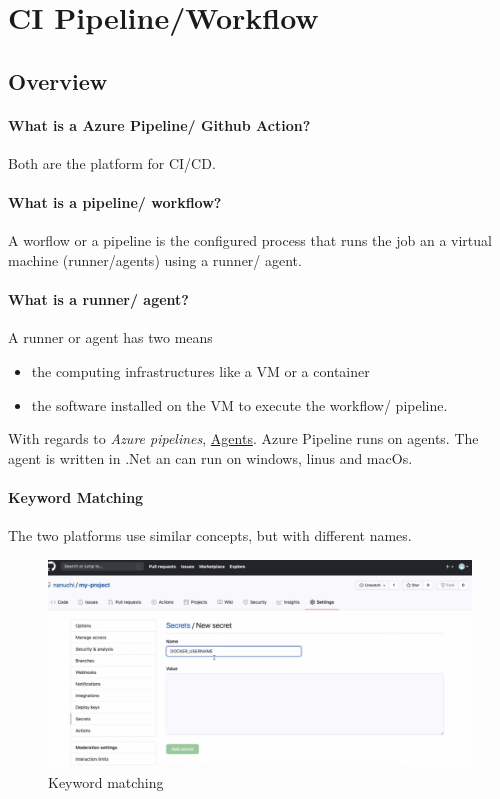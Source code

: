 \section{CI Pipeline/Workflow}
\subsection{Overview}
\paragraph{What is a Azure Pipeline/ Github Action?}
Both are the platform for \gls{CI/CD}.

\paragraph{What is a pipeline/ workflow?}
A worflow or a pipeline is the configured process that runs the job an a virtual machine (runner/agents) using a runner/ agent.

\paragraph{What is a runner/ agent?}
A runner or agent has two means
\begin{itemize}
	\item the computing infrastructures like a VM or a container
	\item the software installed on the VM to execute the workflow/ pipeline.
\end{itemize}

With regards to \textit{Azure pipelines}, \href{https://learn.microsoft.com/en-us/dotnet/architecture/devops-for-aspnet-developers/actions-vs-pipelines}{Agents}. Azure Pipeline runs on agents. The agent is written in .Net an can run on windows, linus and macOs. 

\paragraph{Keyword Matching}
The two platforms use similar concepts, but with different names.

\begin{figure}[H]
	\centering
	\includegraphics[scale = 0.2]{attachment/chapter_2/Scc106}
	\caption{Keyword matching}
\end{figure}

